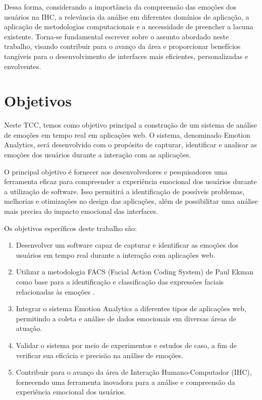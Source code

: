 Dessa forma, considerando a importância da compreensão das emoções dos usuários na IHC, a relevância da análise em diferentes domínios de aplicação, a aplicação de metodologias computacionais e a necessidade de preencher a lacuna existente. Torna-se fundamental escrever sobre o assunto abordado neste trabalho, visando contribuir para o avanço da área e proporcionar benefícios tangíveis para o desenvolvimento de interfaces mais eficientes, personalizadas e envolventes.

\section {Objetivos}

Neste TCC, temos como objetivo principal a construção de um sistema de análise de emoções em tempo real em aplicações web. O sistema, denominado Emotion Analytics, será desenvolvido com o propósito de capturar, identificar e analisar as emoções dos usuários durante a interação com as aplicações.

O principal objetivo é fornecer aos desenvolvedores e pesquisadores uma ferramenta eficaz para compreender a experiência emocional dos usuários durante a utilização de software. Isso permitirá a identificação de possíveis problemas, melhorias e otimizações no design das aplicações, além de possibilitar uma análise mais precisa do impacto emocional das interfaces.

Os objetivos específicos deste trabalho são:

\begin{enumerate}
  \item Desenvolver um software capaz de capturar e identificar as emoções dos usuários em tempo real durante a interação com aplicações web.
  \item Utilizar a metodologia FACS (Facial Action Coding System) de Paul Ekman como base para a identificação e classificação das expressões faciais relacionadas às emoções \cite{5}.
  \item Integrar o sistema Emotion Analytics a diferentes tipos de aplicações web, permitindo a coleta e análise de dados emocionais em diversas áreas de atuação.
  \item Validar o sistema por meio de experimentos e estudos de caso, a fim de verificar sua eficácia e precisão na análise de emoções.
  \item Contribuir para o avanço da área de Interação Humano-Computador (IHC), fornecendo uma ferramenta inovadora para a análise e compreensão da experiência emocional dos usuários.
\end{enumerate}
  
